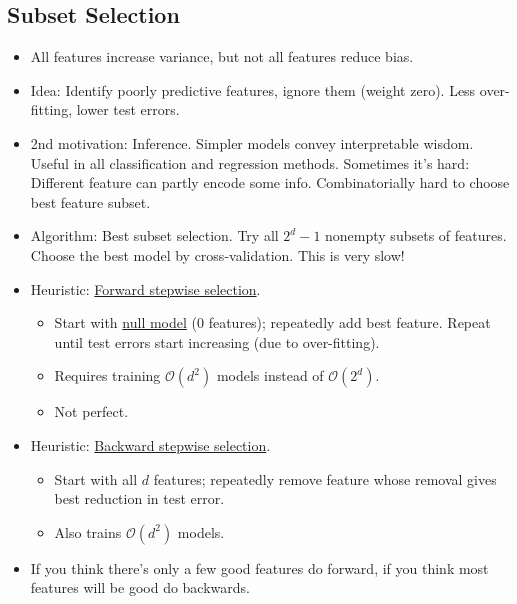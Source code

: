 \documentclass[10pt]{article}
\begin{document}
	\subsection*{Subset Selection}
	\begin{itemize}
		\item All features increase variance, but not all features reduce bias.
		\item Idea: Identify poorly predictive features, ignore them (weight zero). Less over-fitting, lower test errors.
		\item 2nd motivation: Inference. Simpler models convey interpretable wisdom. Useful in all classification and regression methods. Sometimes it's hard: Different feature can partly encode some info. Combinatorially hard to choose best feature subset.
		\item Algorithm: Best subset selection. Try all $2^{d} - 1$ nonempty subsets of features. Choose the best model by cross-validation. This is very slow!
		\item Heuristic: \underline{Forward stepwise selection}.
		\begin{itemize}
			\item Start with \underline{null model} (0 features); repeatedly add best feature. Repeat until test errors start increasing (due to over-fitting).
			\item Requires training $\mathcal{O}(d^{2})$ models instead of $\mathcal{O}(2^{d})$.
			\item Not perfect.
		\end{itemize}
		\item Heuristic: \underline{Backward stepwise selection}.
		\begin{itemize}
			\item Start with all $d$ features; repeatedly remove feature whose removal gives best reduction in test error.
			\item Also trains $\mathcal{O}(d^{2})$ models.
		\end{itemize}
		\item If you think there's only a few good features do forward, if you think most features will be good do backwards.
	\end{itemize}
	
\end{document}
